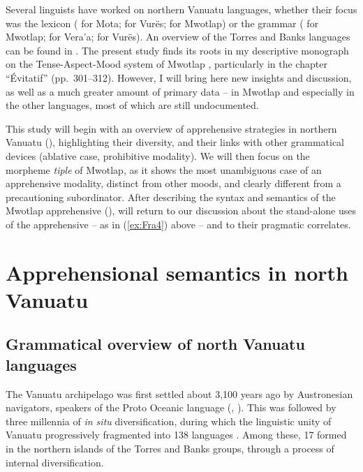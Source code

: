 \documentclass[output=paper,colorlinks,citecolor=brown]{langscibook}
\begin{document}
Several linguists have worked on northern Vanuatu languages, whether their focus was the lexicon (\citealt{CodringtonPalmer1896} for Mota; \citealt{Malau2021} for Vurës; \citealt{François2022b} for Mwotlap) or the grammar (\citealt{François2001,francois2003} for \mbox{Mwotlap}; \citealt{Schnell2011} for Vera'a; \citealt{Malau2016} for Vurës). An overview of the Torres and Banks languages can be found in \citet{François2011,François2012}. The present study finds its roots in my descriptive monograph on the Tense-Aspect-Mood system of \mbox{Mwotlap} \citep{francois2003}, particularly in the chapter ``Évitatif'' (pp.~301--312). However, I will bring here new insights and discussion, as well as a much greater amount of primary data -- in Mwotlap and especially in the other languages, most of which are still undocumented.

This study will begin with an overview of apprehensive strategies in northern Vanuatu (), highlighting their diversity, and their links with other grammatical devices (ablative case, prohibitive modality). We will then focus on the morpheme \textit{tiple} of Mwotlap, as it shows the most unambiguous case of an apprehensive modality, distinct from other moods, and clearly different from a precautioning subordinator. After describing the syntax and semantics of the Mwotlap apprehensive (),  will return to our discussion about the stand-alone uses of the apprehensive -- as in (\ref{ex:Fra4}) above -- and to their pragmatic correlates.
 

\section{Apprehensional semantics in north Vanuatu}
\label{sec:apprehensionalsemantics}

\subsection{Grammatical overview of north Vanuatu languages}
\label{subsec:grammoverview}

 
The Vanuatu archipelago was first settled about 3,100 years ago by Austronesian navigators, speakers of the Proto Oceanic language (\citealt{BedfordSpriggs2008}, \citealt{Lipsonetal2020}). This was followed by three millennia of \textit{in situ} diversification, during which the linguistic unity of Vanuatu progressively fragmented into 138 languages \citep{Françoisetal2015}. Among these, 17 formed in the northern islands of the Torres and Banks groups, through a process of internal diversification.
\end{document}
